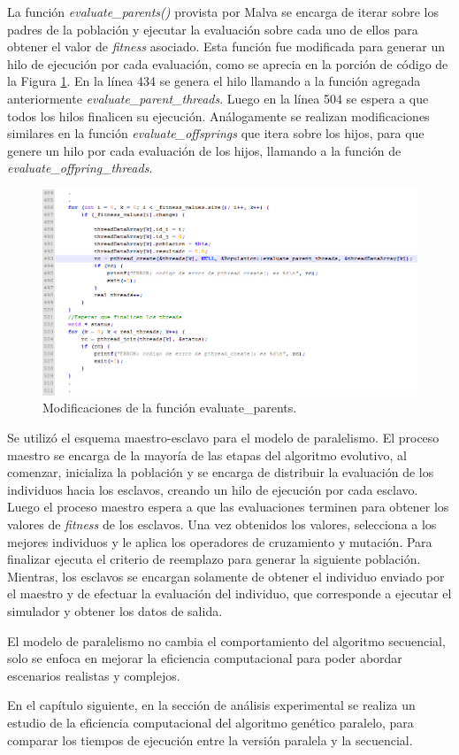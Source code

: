 	
La función \emph{evaluate{\_}parents()} provista por Malva se encarga de iterar sobre los padres de la población y ejecutar la evaluación sobre cada uno de ellos para obtener el valor de \emph{fitness} asociado. Esta función fue modificada para generar un hilo de ejecución por cada evaluación, como se aprecia en la porción de código de la Figura \ref{fig:codigo2}.
En la línea 434  se genera el hilo llamando a la función agregada anteriormente \emph{evaluate{\_}parent{\_}threads}. Luego en la línea 504 se espera a que todos los hilos finalicen su ejecución.
Análogamente se realizan modificaciones similares en la función 	\emph{evaluate{\_}offsprings }que itera sobre los hijos, para que
genere un hilo por cada evaluación de los hijos, llamando a la función de  \emph{evaluate{\_}offpring{\_}threads}.
		
\begin{figure}[H]
	\centering
	\includegraphics[width=0.99\linewidth]{Figures/codigo2}
	\caption{Modificaciones de la función evaluate{\_}parents.}
	\label{fig:codigo2}
\end{figure}		

Se utilizó el esquema maestro-esclavo para el modelo de paralelismo. El proceso maestro se encarga de la mayoría de las etapas del algoritmo evolutivo, al comenzar, inicializa la población y se encarga de distribuir la evaluación de los individuos hacia los esclavos, creando un hilo de ejecución por cada esclavo. Luego el proceso maestro espera a que las evaluaciones terminen para obtener los valores de \emph{fitness} de los esclavos. Una vez obtenidos los valores, selecciona a los mejores individuos y le aplica los operadores de cruzamiento y mutación. Para finalizar ejecuta el criterio de reemplazo para generar la siguiente población. Mientras, los esclavos se encargan solamente de obtener el individuo enviado por el maestro y de efectuar la evaluación del individuo, que corresponde a ejecutar el simulador y obtener los datos de salida. 


El modelo de paralelismo no cambia el comportamiento del algoritmo secuencial, solo se enfoca en mejorar la eficiencia computacional para poder abordar escenarios realistas y complejos.

En el capítulo siguiente, en la sección de análisis experimental se realiza un estudio de la eficiencia computacional del algoritmo genético paralelo, para comparar los tiempos de ejecución entre la versión paralela y la secuencial.